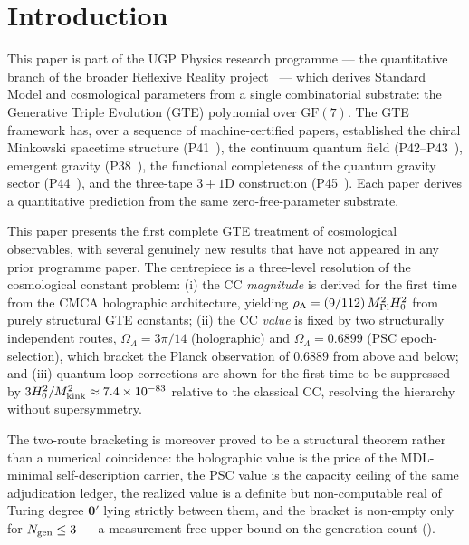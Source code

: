 \documentclass[11pt]{article}
\theoremstyle{remark}
\newcommand{\Mkink}{M_{\rm kink}}
\newcommand{\MPl}{M_{\rm Pl}}
\newcommand{\Hnought}{H_0}
\newcommand{\OmL}{\Omega_\Lambda}
\begin{document}
\section{Introduction}
\label{sec:intro}

This paper is part of the UGP Physics research programme --- the quantitative
branch of the broader Reflexive Reality project~\cite{SpivackCompUniversality,%
SpivackResearchProgrammes} --- which derives Standard Model and cosmological
parameters from a single combinatorial substrate: the Generative Triple
Evolution (GTE) polynomial over $\mathrm{GF}(7)$.  The GTE framework has, over
a sequence of machine-certified papers, established the chiral Minkowski
spacetime structure (P41~\cite{SpivackCMCA}), the continuum quantum field
(P42--P43~\cite{SpivackPhiMDLField,SpivackCompleteness}), emergent gravity
(P38~\cite{SpivackPhiMDLGravity}), the functional completeness of the quantum
gravity sector (P44~\cite{SpivackQGR}), and the three-tape $3{+}1$D
construction (P45~\cite{SpivackThreeTapeCMCA}).  Each paper derives a
quantitative prediction from the same zero-free-parameter substrate.

This paper presents the first complete GTE treatment of cosmological observables, with several genuinely new results that have not appeared in any prior programme paper.
The centrepiece is a three-level resolution of the cosmological constant problem:
(i) the CC \emph{magnitude} is derived for the first time from the CMCA holographic
architecture, yielding $\rho_\Lambda = (9/112)\,\MPl^2\Hnought^2$ from purely
structural GTE constants;
(ii) the CC \emph{value} is fixed by two structurally independent routes,
$\OmL = 3\pi/14$ (holographic) and $\OmL = 0.6899$ (PSC epoch-selection),
which bracket the Planck observation of $0.6889$ from above and below; and
(iii) quantum loop corrections are shown for the first time to be suppressed by
$3\Hnought^2/\Mkink^2 \approx 7.4\times10^{-83}$ relative to the classical CC,
resolving the hierarchy without supersymmetry.

The two-route bracketing is moreover proved to be a structural theorem rather
than a numerical coincidence: the holographic value is the price of the
MDL-minimal self-description carrier, the PSC value is the capacity ceiling of
the same adjudication ledger, the realized value is a definite but
non-computable real of Turing degree $\mathbf{0}'$ lying strictly between them,
and the bracket is non-empty only for $N_{\rm gen} \le 3$ --- a measurement-free
upper bound on the generation count ().
\end{document}
